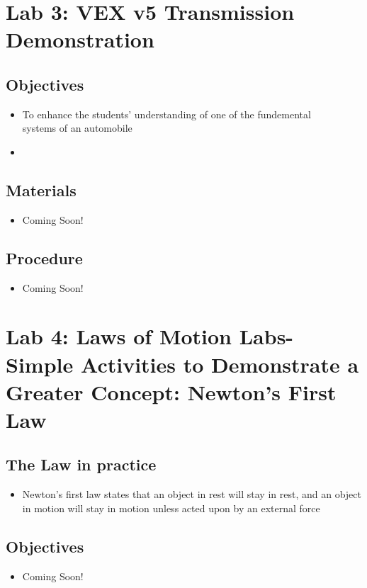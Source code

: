 \documentclass{article}
\begin{document}
\section*{Lab 3: VEX v5 Transmission Demonstration}
    \subsection*{Objectives}
        \begin{itemize}
            \item To enhance the students' understanding of one of the fundemental \\systems of an automobile
            \item 
        \end{itemize}
    \subsection*{Materials}
        \begin{itemize}
            \item Coming Soon!
        \end{itemize}
    \subsection*{Procedure}
        \begin{itemize}
            \item Coming Soon!
        \end{itemize}
\pagebreak  
\setcounter{section}{4} 
\section*{Lab 4: Laws of Motion Labs- Simple Activities to Demonstrate a Greater Concept: Newton's First Law} 
    \subsection{The Law in practice}
        \begin{itemize} 
            \item Newton's first law states that an object in rest will stay in rest, and an object in motion will stay in motion unless acted upon by an external force
        \end{itemize}
    \subsection{Objectives}
        \begin{itemize}
            \item Coming Soon!
        \end{itemize}
\end{document}
